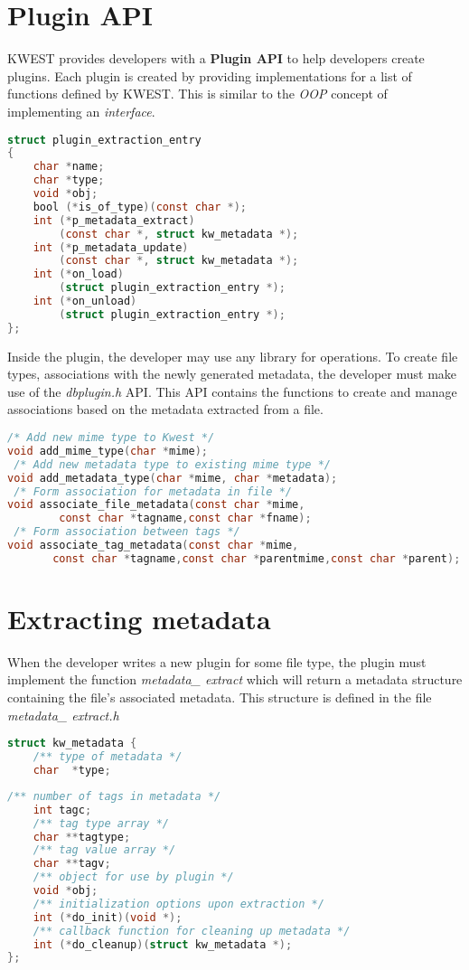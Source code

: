 \section{Plugin API}
KWEST provides developers with a \textbf{Plugin API} to help developers create plugins. Each plugin is created by providing implementations for a list of functions defined by KWEST. This is similar to the \textit{OOP} concept of implementing an \textit{interface}. \\
\begin{lstlisting}[language=C,frame=single]
struct plugin_extraction_entry
{
	char *name;
	char *type;
	void *obj;
	bool (*is_of_type)(const char *);
	int (*p_metadata_extract)
		(const char *, struct kw_metadata *);
	int (*p_metadata_update)
		(const char *, struct kw_metadata *);
	int (*on_load)
		(struct plugin_extraction_entry *);
	int (*on_unload)
		(struct plugin_extraction_entry *);
};
\end{lstlisting}

Inside the plugin, the developer may use any library for operations. To create file types, associations with the newly generated metadata, the developer must make use of the \textit{dbplugin.h} API. This API contains the functions to create and manage associations based on the metadata extracted from a file.

\begin{lstlisting}[language=C,frame=single]
 /* Add new mime type to Kwest */
void add_mime_type(char *mime);
 /* Add new metadata type to existing mime type */
void add_metadata_type(char *mime, char *metadata);
 /* Form association for metadata in file */
void associate_file_metadata(const char *mime,
		const char *tagname,const char *fname);
 /* Form association between tags */
void associate_tag_metadata(const char *mime,
       const char *tagname,const char *parentmime,const char *parent);
\end{lstlisting}

\section{Extracting metadata}
When the developer writes a new plugin for some file type, the plugin must implement the  function \textit{metadata\_ extract} which will return a metadata structure containing the file's associated metadata. This structure is defined in the file \textit{metadata\_ extract.h}
\begin{lstlisting}[language=C,frame=single]
struct kw_metadata {
	/** type of metadata */
	char  *type; 
	\end{lstlisting}
\begin{lstlisting}[language=C,frame=single]
	/** number of tags in metadata */
	int tagc; 
	/** tag type array */
	char **tagtype; 
	/** tag value array */
	char **tagv; 
	/** object for use by plugin */
	void *obj; 
	/** initialization options upon extraction */
	int (*do_init)(void *); 
	/** callback function for cleaning up metadata */
	int (*do_cleanup)(struct kw_metadata *); 
};
\end{lstlisting}

